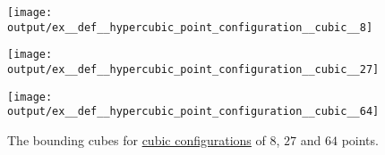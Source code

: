 \begin{example}
\begin{thmenum}
    \begin{figure}[!ht]
    \hfill
      \begin{subcaptionblock}{0.3\textwidth}
        \centering
        \texttt{[image: output/ex\_\_def\_\_hypercubic\_point\_configuration\_\_cubic\_\_8]}
      \end{subcaptionblock}
      \hfill
      \begin{subcaptionblock}{0.3\textwidth}
        \centering
        \texttt{[image: output/ex\_\_def\_\_hypercubic\_point\_configuration\_\_cubic\_\_27]}
      \end{subcaptionblock}
      \hfill
      \begin{subcaptionblock}{0.3\textwidth}
        \centering
        \texttt{[image: output/ex\_\_def\_\_hypercubic\_point\_configuration\_\_cubic\_\_64]}
      \end{subcaptionblock}
      \caption{The bounding cubes for \hyperref[def:hypercube_point_configuration]{cubic configurations} of \( 8 \), \( 27 \) and \( 64 \) points.}\label{fig:ex:def:hypercubic_point_configuration/cubic}
    \end{figure}
  \end{thmenum}
\end{example}

